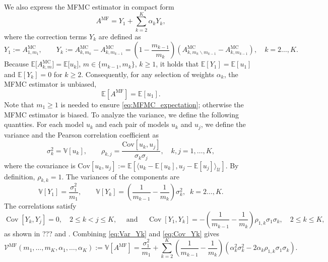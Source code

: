 We also express the MFMC estimator in compact form
\begin{equation*}\label{eq:MFMC_estimator_Correction}
          A^{\text{MF}} = Y_1 + \sum_{k=2}^K \alpha_k Y_k,
\end{equation*}
where the correction terms $Y_k$ are defined as
\begin{equation} \label{eq:MFMC_Yk}
       Y_1 := A^{\text{MC}}_{1,m_1},\qquad 
       Y_k := A^{\text{MC}}_{k,m_k} - A^{\text{MC}}_{k,m_{k-1}}
               =\left(1-\frac{m_{k-1}}{m_k}\right)
                 \left(A_{k,m_k\backslash m_{k-1}}^{\text{MC}}-A_{k,m_{k-1}}^{\text{MC}}\right), \quad k=2\ldots, K.
\end{equation}
%
Because $\mathbb{E}\big[ A^{\text{MC}}_{k,m} \big] = \mathbb{E}\big[ u_k\big]$, $m \in \{ m_{k-1}, m_k \}$, $k\ge 1$,
it holds that  $\mathbb{E}[Y_1] =  \mathbb{E}[u_1]$ and  
$\mathbb{E}[Y_k] = 0$ for $k\ge 2$.
Consequently, for any selection of weights $\alpha_k$, 
the MFMC estimator is  unbiased, 
\begin{equation}\label{eq:MFMC_expectation}
            \mathbb{E}[A^{\text{MF}}] =  \mathbb{E}[u_1].
\end{equation}
Note that $m_1 \ge 1$ is needed to ensure \eqref{eq:MFMC_expectation}; otherwise the MFMC estimator
is biased.
To analyze the variance, we define the following quantties.
For each model $u_k$  and each pair of models $u_k$ and $u_j$, 
we define the variance and the Pearson correlation coefficient as
\begin{equation*}
    \sigma_k^2 = \mathbb{V}\left[u_k\right],\qquad \rho_{k,j} 
                       = \frac{\text{Cov}\left[ u_k, u_j\right]}{\sigma_k\sigma_j}, \quad k,j=1,\dots, K,
\end{equation*}
where the covariance is 
$\text{Cov}[u_k, u_j] := \mathbb{E}[\langle u_k - \mathbb{E}[u_k], u_j - \mathbb{E}[u_j]\rangle_{{\mathcal U}}]$.
By definition, $\rho_{k,k}=1$. 
The variances of the components are
\begin{equation}\label{eq:Var_Yk}
    \mathbb{V}[Y_1] = \frac{\sigma_1^2}{m_1}, \qquad 
    \mathbb{V}[Y_k] = \left(\frac{1}{m_{k-1}} - \frac{1}{m_k}\right)\sigma_k^2, \;\; k=2\ldots, K.
\end{equation}
The correlations satisfy
\begin{equation}\label{eq:Cov_Yk}
\operatorname{Cov} [Y_k,Y_j ]=0, \quad  2\le k<j\le K, 
\quad \mbox{ and } \quad
\operatorname{Cov}[Y_1,Y_k] = -\!\left(\frac{1}{m_{k-1}} - \frac{1}{m_k}\right)\rho_{1,k}\sigma_1\sigma_k,
\quad  2\le k \le K, 
\end{equation}
as shown in ??? and \cite[Lemma~3.2]{BPeherstorfer_KWillcox_MDGunzburger_2016a}. 
Combining \eqref{eq:Var_Yk} and \eqref{eq:Cov_Yk} gives
%
\begin{equation}\label{eq:MFMC_variance0}
    \mathcal{V}^{\text{MF}}(m_1, \ldots, m_K, \alpha_1, \ldots, \alpha_K)
    :=  \mathbb{V}[A^{\text{MF}}]
    =\frac{\sigma_1^2}{m_1} 
    + \sum_{k=2}^K \left(\frac{1}{m_{k-1}} - \frac{1}{m_k}\right)\!\left(\alpha_k^2\sigma_k^2 - 2\alpha_k\rho_{1,k}\sigma_1\sigma_k\right).
\end{equation}

